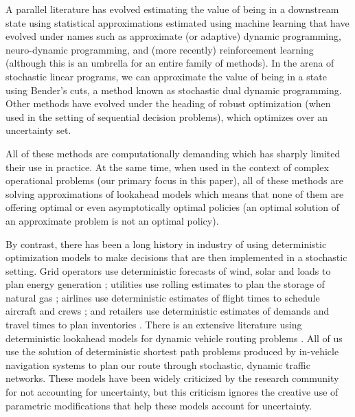 \documentclass[11pt,oneside,fleqn,reqno,titlepage]{article}
\newcounter{example}
\begin{document}
A parallel literature has evolved estimating the value of being in a downstream state using statistical approximations estimated using machine learning that have evolved under names such as approximate (or adaptive) dynamic programming, neuro-dynamic programming, and (more recently) reinforcement learning (although this is an umbrella for an entire family of methods).  In the arena of stochastic linear programs, we can approximate the value of being in a state using Bender's cuts, a method known as stochastic dual dynamic programming.  Other methods have evolved under the heading of robust optimization (when used in the setting of sequential decision problems), which optimizes over an uncertainty set.

All of these methods are computationally demanding which has sharply limited their use in practice.  At the same time, when used in the context of complex operational problems (our primary focus in this paper), all of these methods are solving approximations of lookahead models which means that none of them are offering optimal or even asymptotically optimal policies (an optimal solution of an approximate problem is not an optimal policy).

By contrast, there has been a long history in industry of using deterministic optimization models to make decisions that are then implemented in a stochastic setting.  Grid operators use deterministic forecasts of wind, solar and loads to plan energy generation \citep{wallace2003stochastic}; utilities use rolling estimates to plan the storage of natural gas \citep{Lai2008}; airlines use deterministic estimates of flight times to schedule aircraft and crews \citep{lan2006planning}; and retailers use deterministic estimates of demands and travel times to plan inventories \citep{harrison1999multi}. There is an extensive literature using deterministic lookahead models for dynamic vehicle routing problems \citep{pillac2013}. All of us use the solution of deterministic shortest path problems produced by in-vehicle navigation systems to plan our route through stochastic, dynamic traffic networks.  These models have been widely criticized by the research community for not accounting for uncertainty, but this criticism ignores the creative use of parametric modifications that help these models account for uncertainty.

\end{document}
